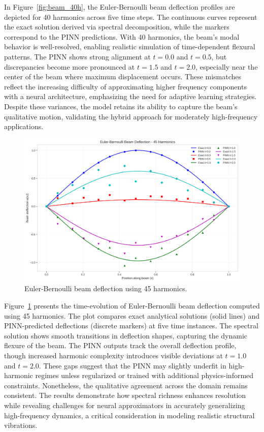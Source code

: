 \documentclass[preprint,12pt]{elsarticle}
\begin{document}
\noindent
In Figure~\ref{fig:beam_40h}, the Euler-Bernoulli beam deflection profiles are depicted for 40 harmonics across five time steps. The continuous curves represent the exact solution derived via spectral decomposition, while the markers correspond to the PINN predictions. With 40 harmonics, the beam’s modal behavior is well-resolved, enabling realistic simulation of time-dependent flexural patterns. The PINN shows strong alignment at \( t = 0.0 \) and \( t = 0.5 \), but discrepancies become more pronounced at \( t = 1.5 \) and \( t = 2.0 \), especially near the center of the beam where maximum displacement occurs. These mismatches reflect the increasing difficulty of approximating higher frequency components with a neural architecture, emphasizing the need for adaptive learning strategies. Despite these variances, the model retains its ability to capture the beam’s qualitative motion, validating the hybrid approach for moderately high-frequency applications.

\begin{figure}[t]
    \centering
    \includegraphics[width=0.9\linewidth]{figures/euler_bernoulli_beam_45h.png}
    \caption{Euler-Bernoulli beam deflection using 45 harmonics.}
    \label{fig:beam_45h}
\end{figure}

\noindent
Figure~\ref{fig:beam_45h} presents the time-evolution of Euler-Bernoulli beam deflection computed using 45 harmonics. The plot compares exact analytical solutions (solid lines) and PINN-predicted deflections (discrete markers) at five time instances. The spectral solution shows smooth transitions in deflection shapes, capturing the dynamic flexure of the beam. The PINN outputs track the overall deflection profile, though increased harmonic complexity introduces visible deviations at \( t = 1.0 \) and \( t = 2.0 \). These gaps suggest that the PINN may slightly underfit in high-harmonic regimes unless regularized or trained with additional physics-informed constraints. Nonetheless, the qualitative agreement across the domain remains consistent. The results demonstrate how spectral richness enhances resolution while revealing challenges for neural approximators in accurately generalizing high-frequency dynamics, a critical consideration in modeling realistic structural vibrations.
\end{document}
